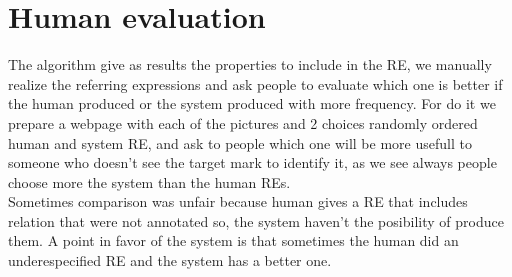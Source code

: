\section{Human evaluation} \label{sec:evaluation}

The algorithm give as results the properties to include in the RE, we manually realize the referring expressions and ask people to evaluate which one is better if the human produced or the system produced with more frequency. For do it we prepare a webpage with each of the pictures and 2 choices randomly ordered human and system RE, and ask to people which one will be more usefull to someone who doesn't see the target mark to identify it, as we see always people choose more the system than the human REs.\\

Sometimes comparison was unfair because human gives a RE that includes relation that were not annotated so, the system haven't the posibility of produce them. A point in favor of the system is that sometimes the human did an underespecified RE and the system has a better one.\\


